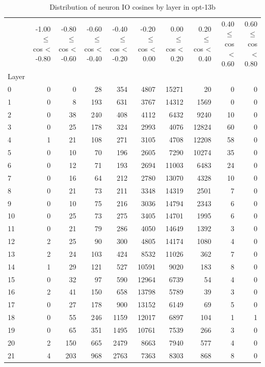 \begin{table}
\caption{Distribution of neuron IO cosines by layer in opt-13b}
\label{tab:opt-13b_half_coarse}
\begin{tabular}{lrrrrrrrrr}
 & -1.00 $\leq$ cos < -0.80 & -0.80 $\leq$ cos < -0.60 & -0.60 $\leq$ cos < -0.40 & -0.40 $\leq$ cos < -0.20 & -0.20 $\leq$ cos < 0.00 & 0.00 $\leq$ cos < 0.20 & 0.20 $\leq$ cos < 0.40 & 0.40 $\leq$ cos < 0.60 & 0.60 $\leq$ cos < 0.80 \\
Layer &  &  &  &  &  &  &  &  &  \\
0 & 0 & 0 & 28 & 354 & 4807 & 15271 & 20 & 0 & 0 \\
1 & 0 & 8 & 193 & 631 & 3767 & 14312 & 1569 & 0 & 0 \\
2 & 0 & 38 & 240 & 408 & 4112 & 6432 & 9240 & 10 & 0 \\
3 & 0 & 25 & 178 & 324 & 2993 & 4076 & 12824 & 60 & 0 \\
4 & 1 & 21 & 108 & 271 & 3105 & 4708 & 12208 & 58 & 0 \\
5 & 0 & 10 & 70 & 196 & 2605 & 7290 & 10274 & 35 & 0 \\
6 & 0 & 12 & 71 & 193 & 2694 & 11003 & 6483 & 24 & 0 \\
7 & 0 & 16 & 64 & 212 & 2780 & 13070 & 4328 & 10 & 0 \\
8 & 0 & 21 & 73 & 211 & 3348 & 14319 & 2501 & 7 & 0 \\
9 & 0 & 10 & 75 & 216 & 3036 & 14794 & 2343 & 6 & 0 \\
10 & 0 & 25 & 73 & 275 & 3405 & 14701 & 1995 & 6 & 0 \\
11 & 0 & 21 & 79 & 286 & 4050 & 14649 & 1392 & 3 & 0 \\
12 & 2 & 25 & 90 & 300 & 4805 & 14174 & 1080 & 4 & 0 \\
13 & 2 & 24 & 103 & 424 & 8532 & 11026 & 362 & 7 & 0 \\
14 & 1 & 29 & 121 & 527 & 10591 & 9020 & 183 & 8 & 0 \\
15 & 0 & 32 & 97 & 590 & 12964 & 6739 & 54 & 4 & 0 \\
16 & 2 & 41 & 150 & 658 & 13798 & 5789 & 39 & 3 & 0 \\
17 & 0 & 27 & 178 & 900 & 13152 & 6149 & 69 & 5 & 0 \\
18 & 0 & 55 & 246 & 1159 & 12017 & 6897 & 104 & 1 & 1 \\
19 & 0 & 65 & 351 & 1495 & 10761 & 7539 & 266 & 3 & 0 \\
20 & 2 & 150 & 665 & 2479 & 8663 & 7940 & 577 & 4 & 0 \\
21 & 4 & 203 & 968 & 2763 & 7363 & 8303 & 868 & 8 & 0 \\

\end{tabular}
\end{table}
